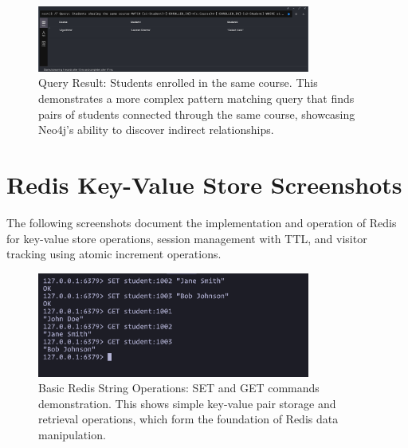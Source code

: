 \begin{figure}[H]
  \centering
  \includegraphics[width=0.8\textwidth]{task-3/screenshots/student-doing-same-course.png}
  \caption{Query Result: Students enrolled in the same course. This demonstrates a more complex pattern matching query that finds pairs of students connected through the same course, showcasing Neo4j's ability to discover indirect relationships.}
  \label{fig:task3-same-course}
\end{figure}

\section{Redis Key-Value Store Screenshots}

The following screenshots document the implementation and operation of Redis for key-value store operations, session management with TTL, and visitor tracking using atomic increment operations.

\begin{figure}[H]
  \centering
  \includegraphics[width=0.8\textwidth]{task-4/screenshots/basic-set-get-operations.png}
  \caption{Basic Redis String Operations: SET and GET commands demonstration. This shows simple key-value pair storage and retrieval operations, which form the foundation of Redis data manipulation.}
  \label{fig:basic-set-get}
\end{figure}

